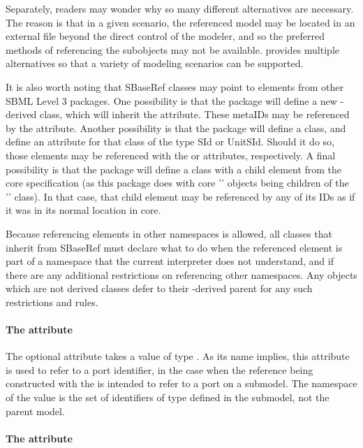 Separately, readers may wonder why so many different alternatives are
necessary.  The reason is that in a given scenario, the referenced model
may be located in an external file beyond the direct control of the
modeler, and so the preferred methods of referencing the subobjects may
not be available.  \SBaseRef provides multiple alternatives so that a
variety of modeling scenarios can be supported.

It is also worth noting that SBaseRef classes may point to elements
from other SBML Level 3 packages.  One possibility is that the package
will define a new \SBase-derived class, which will inherit the 
attribute.  These metaIDs may be referenced by the \SBaseRef {}
attribute.  Another possibility is that the package will define a class,
and define an attribute for that class of the type SId or UnitSId.  Should
it do so, those elements may be referenced with the  or 
attributes, respectively.  A final possibility is that the package will 
define a class with a child element from the core specification (as this 
package does with core '\Model' objects being children of the 
'\ListOfModelDefinitions' class).  In that case, that child element may be 
referenced by any of its IDs as if it was in its normal location in core.

Because referencing elements in other namespaces is allowed, all classes that
inherit from SBaseRef must declare what to do when the referenced element
is part of a namespace that the current interpreter does not understand, and
if there are any additional restrictions on referencing other namespaces.  Any
\SBaseRef objects which are not derived classes defer to their \SBaseRef-derived
parent for any such restrictions and rules.

\paragraph{The \fixttspace{} attribute}
\label{sbaseref-portref}

The optional attribute  takes a value of type
.  As its name implies, this attribute is used to
refer to a port identifier, in the case when the reference being
constructed with the \SBaseRef is intended to refer to a port on a
submodel.  The namespace of the  value is the set
of identifiers of type  defined in the submodel, not
the parent model.


\paragraph{The \fixttspace{} attribute}
\label{sbaseref-idref}

